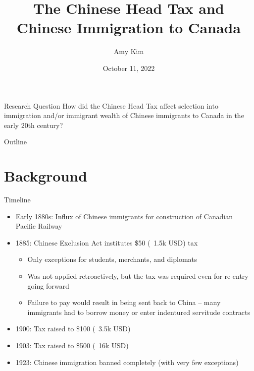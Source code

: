 \documentclass[pdf]{beamer}
\title{The Chinese Head Tax and Chinese Immigration to Canada}
\author{Amy Kim}
\date{October 11, 2022}
\begin{document}
\begin{frame}[plain]
    \titlepage
\end{frame}

\begin{frame}[plain]{Research Question}
    How did the Chinese Head Tax affect selection into immigration and/or immigrant wealth of Chinese immigrants to Canada in the early 20th century?    
\end{frame}

\begin{frame}[plain]{Outline}
    \tableofcontents
\end{frame}


\section{Background}
\begin{frame}{Timeline}
    \begin{itemize}
        \item Early 1880s: Influx of Chinese immigrants for construction of Canadian Pacific Railway
        \item 1885: Chinese Exclusion Act institutes \$50 (~1.5k USD) tax
        \begin{itemize}
            \item Only exceptions for students, merchants, and diplomats
            \item Was not applied retroactively, but the tax was required even for re-entry going forward
            \item Failure to pay would result in being sent back to China -- many immigrants had to borrow money or enter indentured servitude contracts
        \end{itemize}
        \item 1900: Tax raised to \$100 (~3.5k USD)
        \item 1903: Tax raised to \$500 (~16k USD)
        \item 1923: Chinese immigration banned completely (with very few exceptions)
    \end{itemize}
\end{frame}

\end{document}
